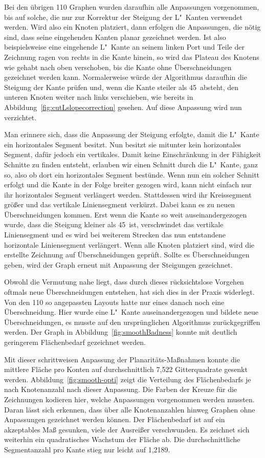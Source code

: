 \documentclass[a4paper]{scrreprt}
\theoremstyle{definition}
\begin{document}
Bei den übrigen 110 Graphen wurden daraufhin alle Anpassungen vorgenommen, bis auf solche, die nur zur Korrektur der Steigung der L"~Kanten verwendet werden. Wird also ein Knoten platziert, dann erfolgen die Anpassungen, die nötig sind, dass seine eingehenden Kanten planar gezeichnet werden. Ist also beispielsweise eine eingehende L"~Kante an seinem linken Port und Teile der Zeichnung ragen von rechts in die Kante hinein, so wird das Plateau des Knotens wie gehabt nach oben verschoben, bis die Kante ohne Überschneidungen gezeichnet werden kann. Normalerweise würde der Algorithmus daraufhin die Steigung der Kante prüfen und, wenn die Kante steiler als 45\textdegree\ absteht, den unteren Knoten weiter nach links verschieben, wie bereits in Abbildung~\ref{fig:cutLslopecorrection} gesehen. Auf diese Anpassung wird nun verzichtet. 

Man erinnere sich, dass die Anpassung der Steigung erfolgte, damit die L"~Kante ein horizontales Segment besitzt. Nun besitzt sie mitunter kein horizontales Segment, dafür jedoch ein vertikales. Damit keine Einschränkung in der Fähigkeit Schnitte zu finden entsteht, erlauben wir einen Schnitt durch die L"~Kante, ganz so, also ob dort ein horizontales Segment bestünde. Wenn nun ein solcher Schnitt erfolgt und die Kante in der Folge breiter gezogen wird, kann nicht einfach nur ihr horizontales Segment verlängert werden. Stattdessen wird ihr Kreissegment größer und das vertikale Liniensegment verkürzt. Dabei kann es zu neuen Überschneidungen kommen. Erst wenn die Kante so weit auseinandergezogen wurde, dass die Steigung kleiner als 45\textdegree\ ist, verschwindet das vertikale Liniensegment und es wird bei weiterem Strecken das nun entstandene horizontale Liniensegment verlängert. Wenn alle Knoten platziert sind, wird die erstellte Zeichnung auf Überschneidungen geprüft. Sollte es Überschneidungen geben, wird der Graph erneut mit Anpassung der Steigungen gezeichnet.

Obwohl die Vermutung nahe liegt, dass durch dieses rücksichtslose Vorgehen oftmals neue Überschneidungen entstehen, hat sich dies in der Praxis widerlegt. Von den 110 so angepassten Layouts hatte nur eines danach noch eine Überschneidung. Hier wurde eine L"~Kante auseinandergezogen und bildete neue Überschneidungen, es musste auf den ursprünglichen Algorithmus zurückgegriffen werden. Der Graph in Abbildung~\ref{fig:smoothBadness} konnte mit deutlich geringerem Flächenbedarf gezeichnet werden.

Mit dieser schrittweisen Anpassung der Planaritäts-Maßnahmen konnte die mittlere Fläche pro Konten auf durchschnittlich 7,522 Gitterquadrate gesenkt werden. Abbildung~\ref{fig:smooth-opti} zeigt die Verteilung des Flächenbedarfs je nach Knotenanzahl nach dieser Anpassung. Die Farben der Kreuze für die Zeichnungen kodieren hier, welche Anpassungen vorgenommen werden mussten. Daran lässt sich erkennen, dass über alle Knotenanzahlen hinweg Graphen ohne Anpassungen gezeichnet werden können. Der Flächenbedarf ist auf ein akzeptables Maß gesunken, viele der Ausreißer verschwunden. Es zeichnet sich weiterhin ein quadratisches Wachstum der Fläche ab. Die durchschnittliche Segmentanzahl pro Kante stieg nur leicht auf 1,2189.
\end{document}
